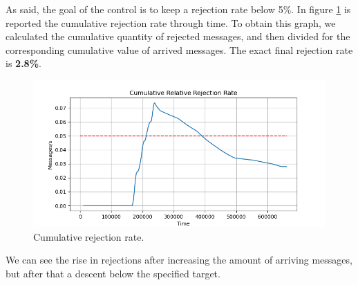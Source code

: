As said, the goal of the control is to keep a rejection rate below 5\%. In figure \ref{fig:uniform_rejection} is reported the cumulative rejection rate through time. To obtain this graph, we calculated the cumulative quantity of rejected messages, and then divided for the corresponding cumulative value of arrived messages. The exact final rejection rate is \textbf{2.8\%}.

\begin{figure}[H]
    \centering
    \includegraphics[width=0.85\linewidth]{images/Uniform/rejectiob_cumulative.png}
    \caption{Cumulative rejection rate.}
    \label{fig:uniform_rejection}
\end{figure}

We can see the rise in rejections after increasing the amount of arriving messages, but after that a descent below the specified target.

